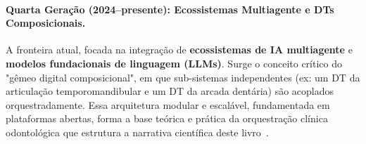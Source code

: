 \paragraph{Quarta Geração (2024--presente): Ecossistemas Multiagente e DTs Composicionais.} 
A fronteira atual, focada na integração de \textbf{ecossistemas de IA multiagente} e \textbf{modelos fundacionais de linguagem (LLMs)}. Surge o conceito crítico do "gêmeo digital composicional", em que sub-sistemas independentes (ex: um DT da articulação temporomandibular e um DT da arcada dentária) são acoplados orquestradamente. Essa arquitetura modular e escalável, fundamentada em plataformas abertas, forma a base teórica e prática da orquestração clínica odontológica que estrutura a narrativa científica deste livro~\cite{robles2023opentwins}.

